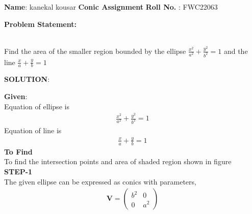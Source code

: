 \documentclass[10pt,a4paper]{report}
\newcommand{\myvec}[1]{\ensuremath{\begin{pmatrix}#1\end{pmatrix}}}
\let\vec\mathbf
\let\vec\mathbf
\begin{document}
\raggedright \textbf{Name}:\hspace{1mm} kanekal kousar\hspace{3cm} \Large \textbf{Conic Assignment}\hspace{2.5cm} %
\normalsize \textbf{Roll No.} :\hspace{1mm} FWC22063\vspace{1cm}
\begin{multicols}{2}

\raggedright \textbf{Problem Statement:}\vspace{2mm}
\raggedright \\Find the area of the smaller region bounded by the ellipse $\frac{x^2}{a^2}+\frac{y^2}{b^2}=1$
and the line $\frac{x}{a}+\frac{y}{b}=1$\\
\vspace{5mm}
\raggedright \textbf{SOLUTION}:\vspace{2mm}\\

\raggedright \textbf{Given}:\vspace{2mm}\\
Equation of ellipse is \\\vspace{1mm}
\begin{align}
\frac{x^2}{a^2}+\frac{y^2}{b^2}=1
\end{align}
Equation of line is \\ \vspace{1mm}
\begin{align}
\frac{x}{a}+\frac{y}{b}=1
\end{align}
\textbf{To Find }\vspace{2mm}\\
To find the intersection points and area of shaded region shown in figure\vspace{2mm}  \\ 
\textbf{STEP-1}\vspace{2mm}\\
The given ellipse can be expressed as conics with parameters,\\ \vspace{1mm}
\begin{align}
\vec{V}=\myvec{
b^2 & 0\\
0 & a^2
}
\end{align}


\end{multicols}
\end{document}
